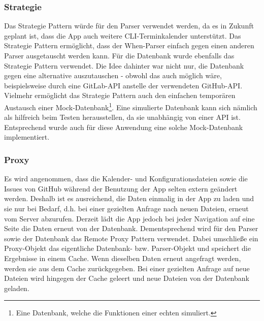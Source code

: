 \subsubsection{Strategie}
Das Strategie Pattern würde für den Parser verwendet werden, da es in Zukunft geplant ist, dass die App auch weitere CLI-Terminkalender unterstützt. Das Strategie Pattern ermöglicht, dass der When-Parser einfach gegen einen anderen Parser ausgetauscht werden kann. %
Für die Datenbank wurde ebenfalls das Strategie Pattern verwendet. %
	Die Idee dahinter war nicht nur, die Datenbank gegen eine alternative auszutauschen - obwohl das auch möglich wäre, beispielsweise durch eine GitLab-API anstelle der verwendeten GitHub-API. %
	Vielmehr ermöglicht das Strategie Pattern auch den einfachen temporären Austausch einer Mock-Datenbank\footnote{Eine Datenbank, welche die Funktionen einer echten simuliert.}. Eine simulierte Datenbank kann sich nämlich als hilfreich beim Testen herausstellen, da sie unabhängig von einer API ist. Entsprechend wurde auch für diese Anwendung eine solche Mock-Datenbank implementiert. %
%
%
%
%
%
\subsubsection{Proxy}%
Es wird angenommen, dass die Kalender- und Konfigurationsdateien sowie die Issues von GitHub während der Benutzung der App selten extern geändert werden. Deshalb ist es ausreichend, die Daten einmalig in der App zu laden und sie nur bei Bedarf, d.h. bei einer gezielten Anfrage nach neuen Dateien, erneut vom Server abzurufen. Derzeit lädt die App jedoch bei jeder Navigation auf eine Seite die Daten erneut von der Datenbank.\newline%
Dementsprechend wird für den Parser sowie der Datenbank das Remote Proxy Pattern verwendet. Dabei umschließe ein Proxy-Objekt das eigentliche Datenbank- bzw. Parser-Objekt und speichert die Ergebnisse in einem Cache. Wenn dieselben Daten erneut angefragt werden, werden sie aus dem Cache zurückgegeben. Bei einer gezielten Anfrage auf neue Dateien wird hingegen der Cache geleert und neue Dateien von der Datenbank geladen.
%
%
%
%
%

